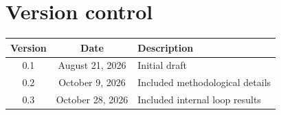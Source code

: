 \documentclass[12pt,a4paper]{article}
\begin{document}
\clearpage
\section*{Version control}

\begin{tabular}{|c|c|l|}
\hline
Version & Date & Description \\
\hline
0.1 & August 21, 2026 & Initial draft \\
0.2 & October 9, 2026 & Included methodological details \\
0.3 & October 28, 2026 & Included internal loop results \\
\hline
\end{tabular}
\end{document}
